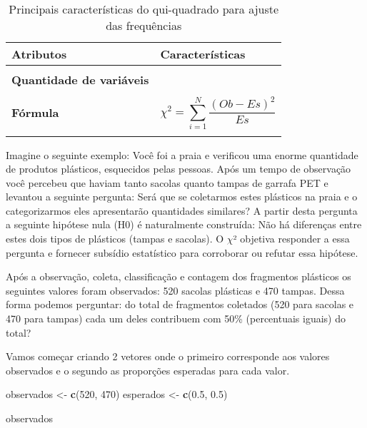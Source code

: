 \documentclass[14pt,titlepage, oneside, openany, a4paper]{book}
\newenvironment{Shaded}{\begin{snugshade}}{\end{snugshade}}
\newcommand{\DecValTok}[1]{\textcolor[rgb]{0.00,0.00,0.81}{#1}}
\newcommand{\FloatTok}[1]{\textcolor[rgb]{0.00,0.00,0.81}{#1}}
\newcommand{\KeywordTok}[1]{\textcolor[rgb]{0.13,0.29,0.53}{\textbf{#1}}}
\newcommand{\NormalTok}[1]{#1}
\newcommand{\StringTok}[1]{\textcolor[rgb]{0.31,0.60,0.02}{#1}}
\begin{document}
\begin{table}

\caption{\label{tab:tab1qui}Principais características do qui-quadrado para ajuste das frequências}
\centering
\begin{tabular}[c]{>{\raggedright\arraybackslash}p{10em}>{\raggedright\arraybackslash}p{30em}}
\toprule
Atributos & Características\\
\midrule
\textbf{\cellcolor{gray!6}{Tipo de variável}} & \cellcolor{gray!6}{Categórica}\\
\textbf{Quantidade de variáveis} & 1\\
\textbf{\cellcolor{gray!6}{Hipótese nula}} & \cellcolor{gray!6}{O número de observações em cada grupo da variável é similar ao predito pela teoria}\\
\textbf{Fórmula} & $$\chi^2=\sum^{N}_{i = 1}\frac{(Ob-Es)^2}{Es}$$\\
\textbf{\cellcolor{gray!6}{Observação}} & \cellcolor{gray!6}{Se há apenas 2 categorias, dentro da variável, não há a necessidade de post-hoc nem expressa-la graficamente}\\
\bottomrule
\end{tabular}
\end{table}

Imagine o seguinte exemplo: Você foi a praia e verificou uma enorme quantidade de produtos plásticos, esquecidos pelas pessoas. Após um tempo de observação você percebeu que haviam tanto sacolas quanto tampas de garrafa PET e levantou a seguinte pergunta: Será que se coletarmos estes plásticos na praia e o categorizarmos eles apresentarão quantidades similares? A partir desta pergunta a seguinte hipótese nula (H0) é naturalmente construída: Não há diferenças entre estes dois tipos de plásticos (tampas e sacolas). O \(\chi\)² objetiva responder a essa pergunta e fornecer subsídio estatístico para corroborar ou refutar essa hipótese.

Após a observação, coleta, classificação e contagem dos fragmentos plásticos os seguintes valores foram observados: 520 sacolas plásticas e 470 tampas. Dessa forma podemos perguntar: do total de fragmentos coletados (520 para sacolas e 470 para tampas) cada um deles contribuem com 50\% (percentuais iguais) do total?

Vamos começar criando 2 vetores onde o primeiro corresponde aos valores observados e o segundo as proporções esperadas para cada valor.

\begin{Shaded}
\begin{Highlighting}[]
\NormalTok{observados <-}\StringTok{ }\KeywordTok{c}\NormalTok{(}\DecValTok{520}\NormalTok{, }\DecValTok{470}\NormalTok{)}
\NormalTok{esperados <-}\StringTok{ }\KeywordTok{c}\NormalTok{(}\FloatTok{0.5}\NormalTok{, }\FloatTok{0.5}\NormalTok{)}

\NormalTok{observados}
\end{Highlighting}
\end{Shaded}
\end{document}
